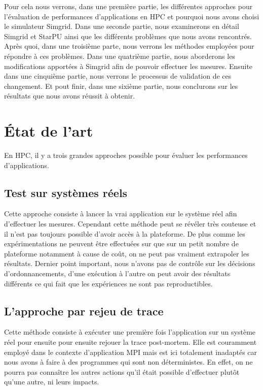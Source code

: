 \documentclass[smallextended]{svjour3}
\begin{document}
Pour cela nous verrons, dans une première partie, les différentes
approches pour l'évaluation de performances d'applications en HPC et
pourquoi nous avons choisi le simulateur Simgrid. Dans une seconde
partie, nous examinerons en détail Simgrid et StarPU ainsi que les
différents problèmes que nous avons rencontrés. Après quoi, dans une
troisième parte, nous verrons les méthodes employées pour répondre à
ces problèmes. Dans une quatrième partie, nous aborderons les
modifications apportées à Simgrid afin de pouvoir effectuer les
mesures. Ensuite dans une cinquième partie, nous verrons le
processus de validation de ces changement. Et pout finir, dans une
sixième partie, nous conclurons sur les résultats que nous avons
réussit à obtenir. 

\section{État de l'art}
\label{sec-2}
En HPC, il y a trois grandes approches possible pour évaluer les
performances d'applications.
\subsection{Test sur systèmes réels}
\label{sec-2-1}
Cette approche consiste à lancer la vrai application sur le système
réel afin d'effectuer les mesures. Cependant cette méthode peut se 
révéler très couteuse et il n'est pas toujours possible d'avoir
accès à la plateforme. De plus comme les expérimentations ne
peuvent être effectuées sur que sur un petit nombre de plateforme
notamment à cause de coût, on ne peut pas vraiment extrapoler les
résultats. Dernier point important, nous n'avons pas de contrôle
sur les décisions d'ordonnancements, d'une exécution à l'autre on
peut avoir des résultats différents ce qui fait que les
expériences ne sont pas reproductibles. 
\subsection{L'approche par rejeu de trace}
\label{sec-2-2}
Cette méthode consiste à exécuter une première fois l'application
sur un système réel pour ensuite pour ensuite rejouer la trace
post-mortem. Elle est couramment employé dans le contexte 
d'application MPI mais est ici totalement inadaptés car nous avons
à faire à des programmes qui sont non déterministes. En effet, on ne
pourra pas connaître les autres actions qu'il était possible
d'effectuer plutôt qu'une autre, ni leurs impacts.
\end{document}

